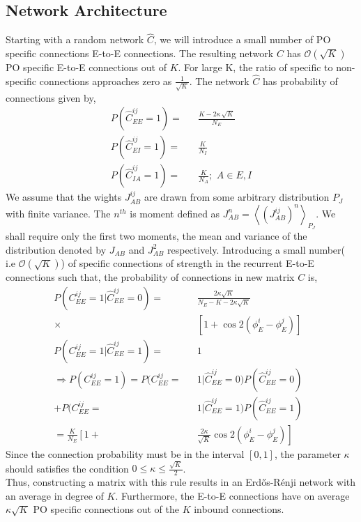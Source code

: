 \subsection{Network Architecture} \label{netwArch}
Starting with a random network $\hat{C}$, we will introduce a small number of PO specific connections E-to-E connections. The resulting network $C$ has $\mathcal{O}(\sqrt{K})$ PO specific E-to-E connections out of $K$. For large K, the ratio of specific to non-specific connections approaches zero as $\frac{1}{\sqrt{K}}$. The network $\hat{C} $ has probability of connections given by, 
\begin{eqnarray}
P(\hat{C}_{EE}^{ij} = 1) =&& \frac{K - 2 \kappa \, \sqrt{K}}{N_E}  \\
P(\hat{C}_{EI}^{ij} = 1) =&& \frac{K}{N_I} \\
P(\hat{C}_{IA}^{ij} = 1) =&& \frac{K}{N_A}; \,\, A \in {E, I} 
\end{eqnarray}
We assume that the wights $J_{AB}^{ij}$ are drawn from some arbitrary distribution $P_J$ with finite variance. The $n^{th}$ is moment defined as $J_{AB}^{n} =  \left\langle \left( J_{AB}^{ij} \right)^n \right\rangle_{P_J}$. We shall require only the first two moments, the mean and variance of the distribution denoted by $J_{AB}$ and  $J_{AB}^2$ respectively. 
Introducing a small number( i.e $ \mathcal{O} \left( \sqrt{K} \right)$) of specific connections of strength in the recurrent E-to-E connections such that, the probability of connections in new matrix $C$ is,
\begin{eqnarray}
P(C_{EE}^{ij} = 1 | \hat{C}_{EE}^{ij} = 0) =&&  \frac{2 \kappa  \sqrt{K}    }{N_E - K - 2 \kappa  \sqrt{K} } \nonumber \\
\times&& \left[ 1 + \cos2(\phi_E^i - \phi_E^j) \right] \,\,\,\, \\
P(C_{EE}^{ij} = 1 | \hat{C}_{EE}^{ij} = 1) =&& 1  \\
\Rightarrow P(C_{EE}^{ij} = 1) = P(C_{EE}^{ij} =&& 1 | \hat{C}_{EE}^{ij} = 0) P(\hat{C}_{EE}^{ij} = 0) \nonumber \\
+ P(C_{EE}^{ij} =&& 1 | \hat{C}_{EE}^{ij} = 1) P(\hat{C}_{EE}^{ij} = 1) \nonumber  \\
= \frac{K}{N_E} \left[1 + \right.&&  \left. \frac{2 \kappa }{\sqrt{K}} \cos 2(\phi_E^i - \phi_E^j) \right]
\end{eqnarray}
Since the connection probability must be in the interval $[0, 1]$, the parameter $\kappa$ should satisfies the condition $0 \leq \kappa \leq \frac{\sqrt{K}}{2}$.\\ %
Thus, constructing a matrix with this rule results in an Erd{\H o}s-R{\'e}nji network with an average in degree of $K$. Furthermore, the E-to-E connections have on average $\kappa \sqrt{K}$ PO specific connections out of the $K$ inbound connections. 
